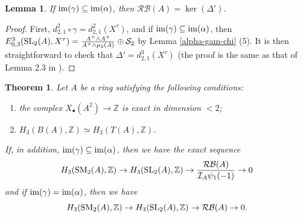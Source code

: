\documentclass[11pt]{amsart}
\theoremstyle{definition}
\theoremstyle{plain}
\newtheorem{lem}[ntn]{Lemma}
\newtheorem{thm}[ntn]{Theorem}
\theoremstyle{definition}
\numberwithin{equation}{section}
\newcommand{\z}{\mathbb{Z}}
\newcommand{\II}{\mathcal{I}}
\newcommand{\RB}{\mathcal{RB}}
\renewcommand{\SS}{\mathcal{S}}
\renewcommand{\aa}{{A^\times}}
\newcommand{\SL}{\mathit{{\rm SL}}}
\newcommand{\SM}{\mathit{{\rm SM}}}
\newcommand{\im}{{\rm im}}
\begin{document}
	\begin{lem}\label{ker-rba}
		If $\im(\gamma)\subseteq\im(\alpha)$, then $\RB(A)=\ker(\Delta')$.
	\end{lem}
	\begin{proof}
		First, $d^2_{2,1}\circ\gamma=d^2_{2,1}(X^\tau)$, and if $\im(\gamma)\subseteq\im(\alpha)$, then $E^3_{0,3}(\SL_2(A),X^\tau)=\frac{\aa\wedge\aa}{\aa\wedge\mu_2(A)}\oplus\SS_2$ by Lemma \ref{alpha-gam-chi} (5). It is then straightforward to check that $\Delta'=d^3_{2,1}(X^\tau)$ (the proof is the same as that of Lemma 2.3 in \cite{B-E-2025}).
	\end{proof}
	\begin{thm}
		\label{thm-main-1}
		Let $A$ be a ring satisfying the following conditions:
		\begin{enumerate}
			\item the complex $X_{\bullet}(A^2)\to\z$ is exact in dimension $<2$;
			\item $H_3(B(A),\z)\simeq H_3(T(A),\z)$.
		\end{enumerate}
		
		If, in addition, $\im(\gamma)\subseteq\im(\alpha)$, then we have the exact sequence
		\[
		H_3(\SM_2(A),\z)\to H_3(\SL_2(A),\z)\to \frac{\RB(A)}{\II_A\psi_1(-1)}\to 0
		\]
		and if $\im(\gamma)=\im(\alpha)$, then we have
		\[
		H_3(\SM_2(A),\z)\to H_3(\SL_2(A),\z)\to \RB(A)\to 0.
		\]
	\end{thm}
\end{document}
